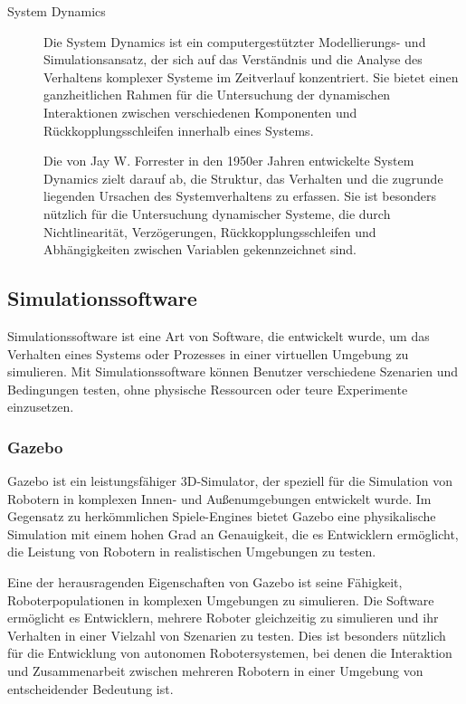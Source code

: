 \begin{description}
    \item[System Dynamics] 
    Die System Dynamics ist ein computergestützter Modellierungs- und Simulationsansatz, der sich auf das Verständnis und die Analyse des Verhaltens komplexer Systeme im Zeitverlauf konzentriert. Sie bietet einen ganzheitlichen Rahmen für die Untersuchung der dynamischen Interaktionen zwischen verschiedenen Komponenten und Rückkopplungsschleifen innerhalb eines Systems.

    Die von Jay W. Forrester in den 1950er Jahren entwickelte System Dynamics zielt darauf ab, die Struktur, das Verhalten und die zugrunde liegenden Ursachen des Systemverhaltens zu erfassen. Sie ist besonders nützlich für die Untersuchung dynamischer Systeme, die durch Nichtlinearität, Verzögerungen, Rückkopplungsschleifen und Abhängigkeiten zwischen Variablen gekennzeichnet sind.
    \cite[vgl.][]{system-dynamics}

\end{description}

\subsection{Simulationssoftware}
Simulationssoftware ist eine Art von Software, die entwickelt wurde, um das Verhalten eines Systems oder Prozesses in einer virtuellen Umgebung zu simulieren. Mit Simulationssoftware können Benutzer verschiedene Szenarien und Bedingungen testen, ohne physische Ressourcen oder teure Experimente einzusetzen.

\subsubsection{Gazebo}
Gazebo ist ein leistungsfähiger 3D-Simulator, der speziell für die Simulation von Robotern in komplexen Innen- und Außenumgebungen entwickelt wurde. Im Gegensatz zu herkömmlichen Spiele-Engines bietet Gazebo eine physikalische Simulation mit einem hohen Grad an Genauigkeit, die es Entwicklern ermöglicht, die Leistung von Robotern in realistischen Umgebungen zu testen.

Eine der herausragenden Eigenschaften von Gazebo ist seine Fähigkeit, Roboterpopulationen in komplexen Umgebungen zu simulieren. Die Software ermöglicht es Entwicklern, mehrere Roboter gleichzeitig zu simulieren und ihr Verhalten in einer Vielzahl von Szenarien zu testen. Dies ist besonders nützlich für die Entwicklung von autonomen Robotersystemen, bei denen die Interaktion und Zusammenarbeit zwischen mehreren Robotern in einer Umgebung von entscheidender Bedeutung ist.


